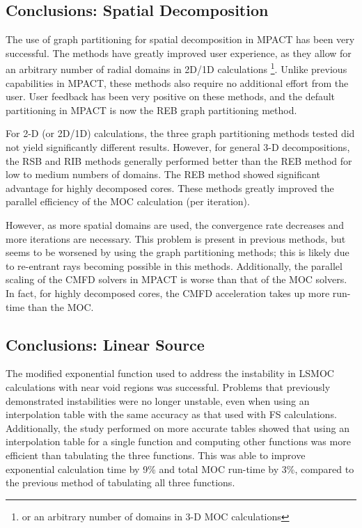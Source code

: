 {{    \subsection{Conclusions: Spatial Decomposition}{\label{ssec:Conclusions:Spatial Decomposition}
      The use of graph partitioning for spatial decomposition in MPACT has been very successful.
      The methods have greatly improved user experience, as they allow for an arbitrary number of radial domains in 2D/1D calculations \footnote{or an arbitrary number of domains in 3-D \ac{MOC} calculations}.
      Unlike previous capabilities in MPACT, these methods also require no additional effort from the user.
      User feedback has been very positive on these methods, and the default partitioning in MPACT is now the \ac{REB} graph partitioning method.

      For 2-D (or 2D/1D) calculations, the three graph partitioning methods tested did not yield significantly different results.
      However, for general 3-D decompositions, the \ac{RSB} and \ac{RIB} methods generally performed better than the \ac{REB} method for low to medium numbers of domains.
      The \ac{REB} method showed significant advantage for highly decomposed cores.
      These methods greatly improved the parallel efficiency of the \ac{MOC} calculation (per iteration).

      However, as more spatial domains are used, the convergence rate decreases and more iterations are necessary.
      This problem is present in previous methods, but seems to be worsened by using the graph partitioning methods; this is likely due to re-entrant rays becoming possible in this methods.
      Additionally, the parallel scaling of the \ac{CMFD} solvers in MPACT is worse than that of the \ac{MOC} solvers.
      In fact, for highly decomposed cores, the \ac{CMFD} acceleration takes up more run-time than the \ac{MOC}.
    }

    \subsection{Conclusions: Linear Source}{\label{ssec:Conclusions:Linear Source}
      The modified exponential function used to address the instability in \ac{LSMOC} calculations with near void regions was successful.
      Problems that previously demonstrated instabilities were no longer unstable, even when using an interpolation table with the same accuracy as that used with \ac{FS} calculations.
      Additionally, the study performed on more accurate tables showed that using an interpolation table for a single function and computing other functions was more efficient than tabulating the three functions.
      This was able to improve exponential calculation time by 9\% and total \ac{MOC} run-time by 3\%, compared to the previous method of tabulating all three functions.

}}}
